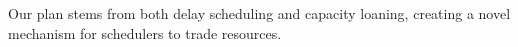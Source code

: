 
Our plan stems from both delay scheduling and capacity loaning, creating a novel mechanism for schedulers 
to trade resources.

